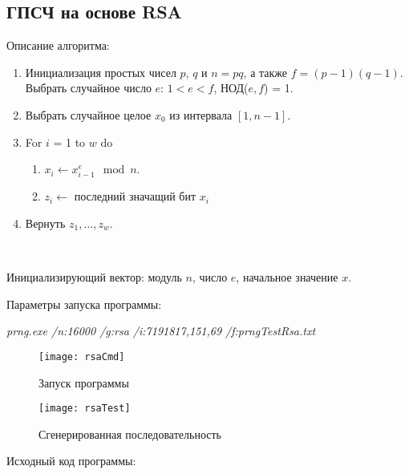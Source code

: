 \documentclass[bachelor, och, coursework]{shiza}
\begin{document}
	
	\subsection{ГПСЧ на основе RSA}
	
	Описание алгоритма:
	
	\begin{enumerate}
		\item Инициализация простых чисел $p$, $q$ и $n = pq$, а также $f = (p - 1)(q - 1)$. Выбрать случайное число $e$: $1 < e < f$, НОД($e, f$) = 1.
		\item Выбрать случайное целое $x_0$ из интервала $[1, n - 1]$.
		\item For $i$ = 1 to $w$ do
		\begin{enumerate}
			\item $x_i \leftarrow x_{i-1}^e \mod n$.
			\item $z_i \leftarrow $ последний значащий бит $x_i$
		\end{enumerate}
		\item Вернуть $z_1, \dots, z_w$.
	\end{enumerate} \
	
	Инициализирующий вектор: модуль $n$, число $e$, начальное значение $x$.
	
	Параметры запуска программы:
	
	\textit{prng.exe /n:16000 /g:rsa /i:7191817,151,69 /f:prngTestRsa.txt}
	
	\begin{figure}[H]
		\centering
		\texttt{[image: rsaCmd]}
		\caption{Запуск программы}
		\label{fig:rsaCmd}
	\end{figure}
	
	\begin{figure}[H]
		\centering
		\texttt{[image: rsaTest]}
		\caption{Сгенерированная последовательность}
		\label{fig:rsaTest}
	\end{figure}

		Исходный код программы:
	
\end{document}
